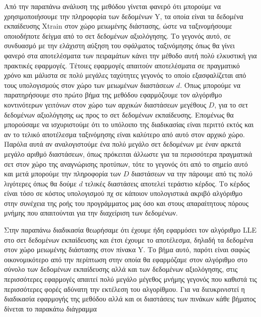 \par
Από την παραπάνω ανάλυση της μεθόδου γίνεται φανερό ότι μπορούμε να χρησιμοποιήσουμε την πληροφορία των δεδομένων \textlatin{Y}, τα οποία είναι τα δεδομένα εκπαίδευσης \textlatin{Xtrain} στον χώρο μειωμένης διάστασης, ώστε να ταξινομήσουμε οποιοδήποτε δείγμα από το σετ δεδομένων αξιολόγησης. Το γεγονός αυτό, σε συνδυασμό με την ελάχιστη αύξηση του σφάλματος ταξινόμησης όπως θα γίνει φανερό στα αποτελέσματα των πειραμάτων κάνει την μέθοδο αυτή πολύ ελκυστική για πρακτικές εφαρμογές. Τέτοιες εφαρμογές απαιτούν αποτελέσματα σε πραγματικό χρόνο και μάλιστα σε πολύ μεγάλες ταχύτητες γεγονός το οποίο εξασφαλίζεται από τους υπολογισμούς στον χώρο των μειωμένων διαστάσεων $d$. Όπως μπορούμε να παρατηρήσουμε στο πρώτο βήμα της μεθόδου εφαρμόζουμε τον αλγόριθμο κοντινότερων γειτόνων στον χώρο των αρχικών διαστάσεων μεγέθους $D$, για το σετ δεδομένων αξιολόγησης ως προς το σετ δεδομένων εκπαίδευσης. Επομένως θα μπορούσαμε να ισχυριστούμε ότι το υπόλοιπο της διαδικασίας είναι περιττό εκτός και αν το τελικό αποτέλεσμα ταξινόμησης είναι καλύτερο από αυτό στον αρχικό χώρο. Παρόλα αυτά αν αναλογιστούμε ένα πολύ μεγάλο σετ δεδομένων με έναν αρκετά μεγάλο αριθμό διαστάσεων, όπως πρόκειται άλλωστε για τα περισσότερα πραγματικά σετ στον χώρο της αναγνώρισης προτύπων, τότε το γεγονός ότι από το σημείο αυτό και μετά μπορούμε την πληροφορία των $D$ διαστάσεων να την πάρουμε από τις πολύ λιγότερες όπως θα δούμε $d$ τελικές διαστάσεις αποτελεί τεράστιο κέρδος. Το κέρδος είναι τόσο σε κόστος υπολογισμού πχ σε κάποιον υπολογιστικά ακριβό αλγόριθμο στην συνέχεια της ροής του προγράμματος μας όσο και στους απαραίτητους πόρους μνήμης που απαιτούνται για την διαχείριση των δεδομένων.  
\par
Στην παραπάνω διαδικασία θεωρήσαμε ότι έχουμε ήδη εφαρμόσει τον αλγόριθμο \textlatin{LLE} στο σετ δεδομένων εκπαίδευσης και έτσι έχουμε το αποτέλεσμα, δηλαδή τα δεδομένα στον χώρο μειωμένης διάστασης στον πίνακα \textlatin{Y}. Το βήμα αυτό, παρότι είναι σαφώς οικονομικότερο από την περίπτωση στην οποία θα εφαρμόζαμε στον αλγόριθμο στο σύνολο των δεδομένων εκπαίδευσης αλλά και των δεδομένων αξιολόγησης, στις περισσότερες εφαρμογές απαιτεί πολύ μεγάλο μέγεθος μνήμης γεγονός που καθιστά τις περισσότερες φορές αδύνατη την εκτέλεση του αλγορίθμου. Για να διευκρινιστεί η διαδικασία εφαρμογής της μεθόδου αλλά και οι διαστάσεις των πινάκων κάθε βήματος δίνεται το παρακάτω διάγραμμα  
\newpage
